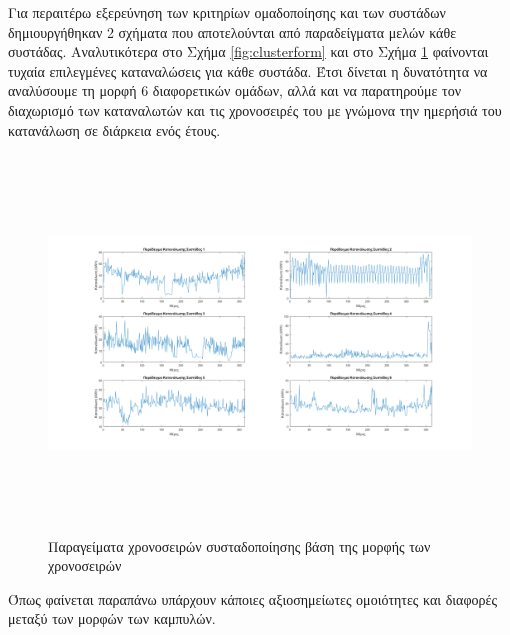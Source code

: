 Για περαιτέρω εξερεύνηση των κριτηρίων ομαδοποίησης και των συστάδων δημιουργήθηκαν 2 σχήματα που αποτελούνται από παραδείγματα μελών κάθε συστάδας. Αναλυτικότερα στο Σχήμα \ref{fig:clusterform} και στο Σχήμα \ref{fig:clusterconslevel} φαίνονται τυχαία επιλεγμένες καταναλώσεις για κάθε συστάδα. Έτσι δίνεται η δυνατότητα να αναλύσουμε τη μορφή 6 διαφορετικών ομάδων, αλλά και να παρατηρούμε τον διαχωρισμό των καταναλωτών και τις χρονοσειρές του με γνώμονα την ημερήσιά του κατανάλωση σε διάρκεια ενός έτους.
\begin{figure}[ht!]
\centering
\includegraphics[width=180mm, height=100mm]{../../plots/Consumption_Analysis/gr_cluster_form.png}
\caption{Παραγείματα χρονοσειρών συσταδοποίησης βάση της μορφής των χρονοσειρών}
\label{fig:clusterconslevel}
\end{figure}
Όπως φαίνεται παραπάνω υπάρχουν κάποιες αξιοσημείωτες ομοιότητες και διαφορές μεταξύ των μορφών των καμπυλών.
